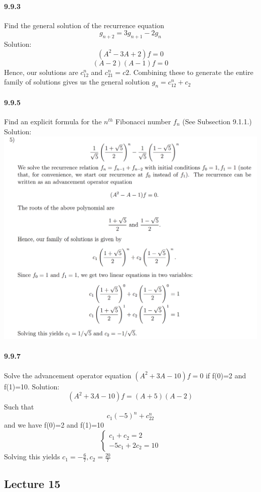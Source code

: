 \documentclass{article}
\begin{document}
\paragraph{9.9.3}
Find the general solution of the recurrence equation
$$g_{n+2}=3g_{n+1}-2g_n$$
Solution:\newline
$$(A^2-3A+2)f=0$$
$$(A-2)(A-1)f=0$$
Hence, our solutions are $c_12^n$ and $c_21^n = c2$. Combining these to generate the entire family of solutions gives us the general solution $g_n=c_12^n+c_2$
\paragraph{9.9.5}
Find an explicit formula for the $n^{th}$ Fibonacci number $f_n$ (See Subsection 9.1.1.)\newline
Solution:\newline
\includegraphics{0045}
\paragraph{9.9.7}
Solve the advancement operator equation $(A^2+3A-10)f=0$ if f(0)=2 and f(1)=10.\newline
Solution:\newline
$$(A^2+3A-10)f=(A+5)(A-2)$$
Such that
$$c_1(-5)^n+c_22^n$$ and we have f(0)=2 and f(1)=10
$$\begin{cases}
    {c_1+c_2=2}\\{-5c_1+2c_2=10}
\end{cases}$$
Solving this yields $c_1=-\frac{6}{7}, c_2=\frac{20}{7}$
\subsection{Lecture 15}
\end{document}
